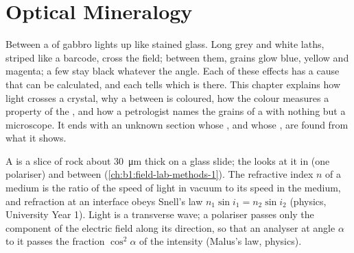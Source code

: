 \chapter{Optical Mineralogy}\label{ch:b1:optical-mineralogy}

Between  a  of gabbro lights up like stained glass.
Long grey and white laths, striped like a barcode, cross the field; between
them, grains glow blue, yellow and magenta; a few stay black whatever the
angle. Each of these effects has a cause that can be calculated, and each
tells which  is there. This chapter explains how light crosses a
crystal, why a  between  is coloured, how the colour
measures a property of the , and how a petrologist names the grains of
a  with nothing but a microscope. It ends with an unknown section
whose , and whose , are found from what it shows.

\begin{recall}
A  is a slice of rock about \qty{30}{\micro m} thick on a glass
slide; the  looks at it in  (one
polariser) and between  (\cref{ch:b1:field-lab-methods-1}). The
refractive index $n$ of a medium is the ratio of the speed of light in vacuum
to its speed in the medium, and refraction at an interface obeys Snell's law
$n_1\sin i_1 = n_2\sin i_2$ (physics, University Year 1). Light is a
transverse wave; a polariser passes only the component of the electric field
along its direction, so that an analyser at angle $\alpha$ to it passes the
fraction $\cos^2\alpha$ of the intensity (Malus's law, physics).
\end{recall}

